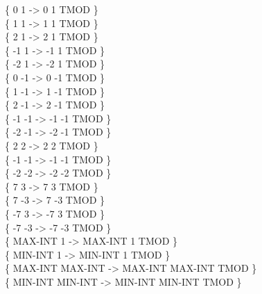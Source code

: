 \begin{tt}
\{       0       1  ->       0       1 TMOD \} \\
\{       1       1  ->       1       1 TMOD \} \\
\{       2       1  ->       2       1 TMOD \} \\
\{      -1       1  ->      -1       1 TMOD \} \\
\{      -2       1  ->      -2       1 TMOD \} \\
\{       0      -1  ->       0      -1 TMOD \} \\
\{       1      -1  ->       1      -1 TMOD \} \\
\{       2      -1  ->       2      -1 TMOD \} \\
\{      -1      -1  ->      -1      -1 TMOD \} \\
\{      -2      -1  ->      -2      -1 TMOD \} \\
\{       2       2  ->       2       2 TMOD \} \\
\{      -1      -1  ->      -1      -1 TMOD \} \\
\{      -2      -2  ->      -2      -2 TMOD \} \\
\{       7       3  ->       7       3 TMOD \} \\
\{       7      -3  ->       7      -3 TMOD \} \\
\{      -7       3  ->      -7       3 TMOD \} \\
\{      -7      -3  ->      -7      -3 TMOD \} \\
\{ MAX-INT       1  -> MAX-INT       1 TMOD \} \\
\{ MIN-INT       1  -> MIN-INT       1 TMOD \} \\
\{ MAX-INT MAX-INT  -> MAX-INT MAX-INT TMOD \} \\
\{ MIN-INT MIN-INT  -> MIN-INT MIN-INT TMOD \}


\end{tt}
